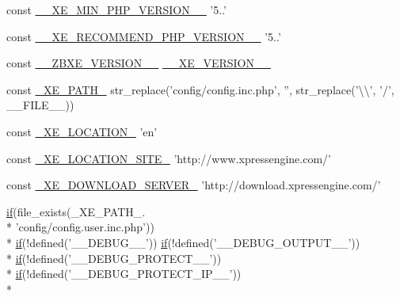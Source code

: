 \begin{DoxyCompactItemize}
\item 
const \hyperlink{config_8inc_8php_a9efd2b40fddf6f5bdc89660de1492f93}{\-\_\-\-\_\-\-X\-E\-\_\-\-M\-I\-N\-\_\-\-P\-H\-P\-\_\-\-V\-E\-R\-S\-I\-O\-N\-\_\-\-\_\-} '5..'
\item 
const \hyperlink{config_8inc_8php_a46828ee09f5bc69de2b897e3b605e9d8}{\-\_\-\-\_\-\-X\-E\-\_\-\-R\-E\-C\-O\-M\-M\-E\-N\-D\-\_\-\-P\-H\-P\-\_\-\-V\-E\-R\-S\-I\-O\-N\-\_\-\-\_\-} '5..'
\item 
const \hyperlink{config_8inc_8php_a0e70c145bf3712e075af5c3861045dc9}{\-\_\-\-\_\-\-Z\-B\-X\-E\-\_\-\-V\-E\-R\-S\-I\-O\-N\-\_\-\-\_\-} \hyperlink{config_8inc_8php_afceaaec30d0e5b6a78d0ae28bcbfc8f3}{\-\_\-\-\_\-\-X\-E\-\_\-\-V\-E\-R\-S\-I\-O\-N\-\_\-\-\_\-}
\item 
const \hyperlink{config_8inc_8php_a5387c7a3f2aa38adf16f324cee88db88}{\-\_\-\-X\-E\-\_\-\-P\-A\-T\-H\-\_\-} str\-\_\-replace('config/config.\-inc.\-php', '', str\-\_\-replace('\textbackslash{}\textbackslash{}', '/', \-\_\-\-\_\-\-F\-I\-L\-E\-\_\-\-\_\-))
\item 
const \hyperlink{config_8inc_8php_a7330debbfb3a027cdd5f3d3dd1dfbdd0}{\-\_\-\-X\-E\-\_\-\-L\-O\-C\-A\-T\-I\-O\-N\-\_\-} 'en'
\item 
const \hyperlink{config_8inc_8php_a063bfd2eb9f811b1676d0dbc0cad2648}{\-\_\-\-X\-E\-\_\-\-L\-O\-C\-A\-T\-I\-O\-N\-\_\-\-S\-I\-T\-E\-\_\-} 'http\-://www.\-xpressengine.\-com/'
\item 
const \hyperlink{config_8inc_8php_a22df32d3e0eae0d60d6cddb9ec99d5ec}{\-\_\-\-X\-E\-\_\-\-D\-O\-W\-N\-L\-O\-A\-D\-\_\-\-S\-E\-R\-V\-E\-R\-\_\-} 'http\-://download.\-xpressengine.\-com/'
\item 
\hyperlink{index_8php_a89c9c4ffebb12a316e28d000a981cf89}{if}(file\-\_\-exists(\-\_\-\-X\-E\-\_\-\-P\-A\-T\-H\-\_\-. \\*
'config/config.\-user.\-inc.\-php')) \\*
\hyperlink{index_8php_a89c9c4ffebb12a316e28d000a981cf89}{if}(!defined('\-\_\-\-\_\-\-D\-E\-B\-U\-G\-\_\-\-\_\-')) \hyperlink{index_8php_a89c9c4ffebb12a316e28d000a981cf89}{if}(!defined('\-\_\-\-\_\-\-D\-E\-B\-U\-G\-\_\-\-O\-U\-T\-P\-U\-T\-\_\-\-\_\-')) \\*
\hyperlink{index_8php_a89c9c4ffebb12a316e28d000a981cf89}{if}(!defined('\-\_\-\-\_\-\-D\-E\-B\-U\-G\-\_\-\-P\-R\-O\-T\-E\-C\-T\-\_\-\-\_\-')) \\*
\hyperlink{index_8php_a89c9c4ffebb12a316e28d000a981cf89}{if}(!defined('\-\_\-\-\_\-\-D\-E\-B\-U\-G\-\_\-\-P\-R\-O\-T\-E\-C\-T\-\_\-\-I\-P\-\_\-\-\_\-')) \\*

\end{DoxyCompactItemize}
